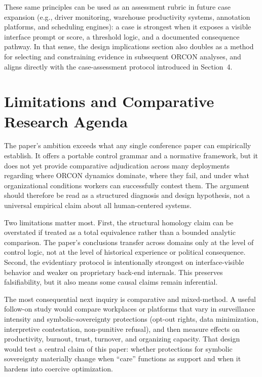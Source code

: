 \documentclass[runningheads]{llncs}
\begin{document}
These same principles can be used as an assessment rubric in future case expansion (e.g., driver monitoring, warehouse productivity systems, annotation platforms, and scheduling engines): a case is strongest when it exposes a visible interface prompt or score, a threshold logic, and a documented consequence pathway. In that sense, the design implications section also doubles as a method for selecting and constraining evidence in subsequent ORCON analyses, and aligns directly with the case-assessment protocol introduced in Section~4.

\section{Limitations and Comparative Research Agenda}

The paper's ambition exceeds what any single conference paper can empirically establish. It offers a portable control grammar and a normative framework, but it does not yet provide comparative adjudication across many deployments regarding where ORCON dynamics dominate, where they fail, and under what organizational conditions workers can successfully contest them. The argument should therefore be read as a structured diagnosis and design hypothesis, not a universal empirical claim about all human-centered systems.

Two limitations matter most. First, the structural homology claim can be overstated if treated as a total equivalence rather than a bounded analytic comparison. The paper's conclusions transfer across domains only at the level of control logic, not at the level of historical experience or political consequence. Second, the evidentiary protocol is intentionally strongest on interface-visible behavior and weaker on proprietary back-end internals. This preserves falsifiability, but it also means some causal claims remain inferential.

The most consequential next inquiry is comparative and mixed-method. A useful follow-on study would compare workplaces or platforms that vary in surveillance intensity and symbolic-sovereignty protections (opt-out rights, data minimization, interpretive contestation, non-punitive refusal), and then measure effects on productivity, burnout, trust, turnover, and organizing capacity. That design would test a central claim of this paper: whether protections for symbolic sovereignty materially change when ``care'' functions as support and when it hardens into coercive optimization.
\end{document}
